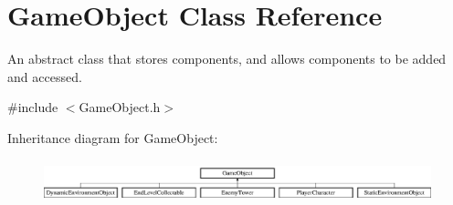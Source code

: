 \hypertarget{class_game_object}{}\section{Game\+Object Class Reference}
\label{class_game_object}


An abstract class that stores components, and allows components to be added and accessed.  




{\ttfamily \#include $<$Game\+Object.\+h$>$}

Inheritance diagram for Game\+Object\+:\begin{figure}[H]
\begin{center}
\leavevmode
\includegraphics[height=1.272727cm]{class_game_object}
\end{center}
\end{figure}
